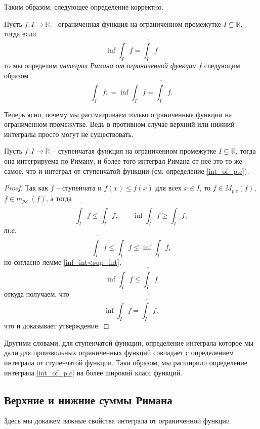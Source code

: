Таким образом, следующее определение корректно.

\begin{definition}\label{int_of_bounded} Пусть $f:I \to \mathbb{R}$ -- ограниченная функция на ограниченном промежутке $I \subsetneq \mathbb{R}$, тогда если
\[
 \inf \int_I f = \overline{\int_I} f
\]
то мы определим \textit{интеграл Римана от ограниченной функции $f$} следующим образом
\[
 \int_I f: = \inf \int_I f = \overline{\int_I}f .
\]
\end{definition}

\begin{remark}\label{why_bounded}
 Теперь ясно, почему мы рассматриваем только ограниченные функции на ограниченном промежутке. Ведь в противном случае верхний или нижний интегралы просто могут не существовать.    
\end{remark}



\begin{lemma}\label{int_coinside}
    Пусть $f: I \to \mathbb{R}$ -- ступенчатая функция на ограниченном промежутке $I \subsetneq \mathbb{R}$, тогда она интегрируема по Риману, и более того интеграл Римана от неё это то же самое, что и интеграл от ступенчатой функции (см. определение \ref{int_of_p.c}).
\end{lemma}

\begin{proof}
Так как $f$ -- ступенчата и $f(x) \le f(x)$ для всех $x \in I$, то $f\in M_{p.c}(f)$, $f \in m_{p.c.}(f)$, а тогда 
\[
 \overline{\int_I} f \le \int_I f, \qquad \inf \int_I f \ge \int_I f,
\]
\textit{т.е.}
\[
 \overline{\int_I} f \le \int_I f \le \inf \int_I f,
\]
но согласно лемме \ref{inf_int<sup_int}, 
\[
 \inf \int_I f \le \overline{\int_I} f
\]
откуда получаем, что
\[
 \inf \int_I f = \overline{\int_I} f,
\]
что и доказывает утверждение.
\end{proof}


Другими словами, для ступенчатой функции, определение интеграла которое мы дали для произвольных ограниченных функций совпадает с определением интеграла от ступенчатой функции. Таки образом, мы расширили определение интеграла \ref{int_of_p.c} на более широкий класс функций.

\subsection{Верхние и нижние суммы Римана}

Здесь мы докажем важные свойства интеграла от ограниченной функции.

